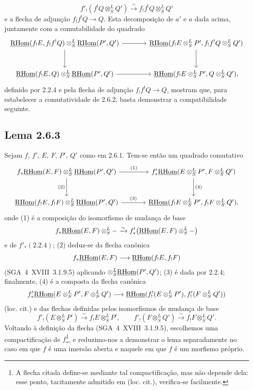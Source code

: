 \[
f'_!(f^!Q\otimes^L_SQ')\xrightarrow{\sim}f_!f^!Q\otimes^L_SQ'
\]
e a flecha de adjunção $f_!f^!Q\to Q$. Esta decomposição de $a'$ e $a$ dada acima, juntamente com a comutabilidade do quadrado
\[
\begin{tikzcd}[column sep=large,row sep=large]
\uRHom(f_!E,f_!f^!Q)\otimes^L_S\uRHom(P',Q') \arrow[r] \arrow[d] & \uRHom(f_!E\otimes^L_SP',f_!f^!Q\otimes^L_SQ') \arrow[d]\\
\uRHom(f_!E,Q)\otimes^L_S\uRHom(P',Q') \arrow[r] & \uRHom(f_!E\otimes^L_SP',Q\otimes^L_SQ'),
\end{tikzcd}
\]
definido por 2.2.4 e pela flecha de adjunção $f_!f^!Q\to Q$, mostram que, para estabelecer a comutatividade de 2.6.2, basta demonstrar a compatibilidade seguinte.

\subsection*{Lema 2.6.3}
Sejam $f$, $f'$, $E$, $F$, $P'$, $Q'$ como em 2.6.1. Tem-se então um quadrado comutativo
\[
\begin{tikzcd}[column sep=large,row sep=large]
f_*\uRHom(E,F)\otimes^L_S\uRHom(P',Q') \arrow[r,"(1)"] \arrow[d,"(2)"'] & f'_*\uRHom(E\otimes^L_SP',F\otimes^L_SQ') \arrow[d,"(4)"]\\
\uRHom(f_!E,f_!F)\otimes^L_S\uRHom(P',Q') \arrow[r,"(3)"] & \uRHom(f_!E\otimes^L_SP',f_!F\otimes^L_SQ'),
\end{tikzcd}
\]
onde (1) é a composição do isomorfismo de mudança de base
\[
f_*\underline{\mathrm{RHom}}(E,F)\otimes^L_S -\xrightarrow{\sim}f'_*\bigl(\underline{\mathrm{RHom}}(E,F)\otimes^L_S-\bigr)
\]
e de $f'_*(2.2.4)$; (2) deduz-se da flecha canônica
\[
f_*\underline{\mathrm{RHom}}(E,F)\longrightarrow\underline{\mathrm{RHom}}(f_!E,f_!F)
\]
(SGA~4~XVIII~3.1.9.5) aplicando $\otimes^L_S\underline{\mathrm{RHom}}(P',Q')$; (3) é dada por 2.2.4; finalmente, (4) é a composta da flecha canônica
\[
f'_*\underline{\mathrm{RHom}}(E\otimes^L_SP',F\otimes^L_SQ')
\longrightarrow
\underline{\mathrm{RHom}}(f'_!(E\otimes^L_SP'),f'_!(F\otimes^L_SQ'))
\]
(loc. cit.) e das flechas definidas pelos isomorfismos de mudança de base
\[
f'_!(E\otimes^L_SP')\xrightarrow{\sim}f_!E\otimes^L_SP',
\qquad
f'_!(F\otimes^L_SQ')\xrightarrow{\sim}f_!F\otimes^L_SQ'.
\]
Voltando à definição da flecha (SGA~4~XVIII~3.1.9.5), escolhemos uma compactificação de $f$\footnote{A flecha citada define-se mediante tal compactificação, mas não depende dela: esse ponto, tacitamente admitido em (loc. cit.), verifica-se facilmente.}, e reduzimo-nos a demonstrar o lema separadamente no caso em que $f$ é uma imersão aberta e naquele em que $f$ é um morfismo próprio.

